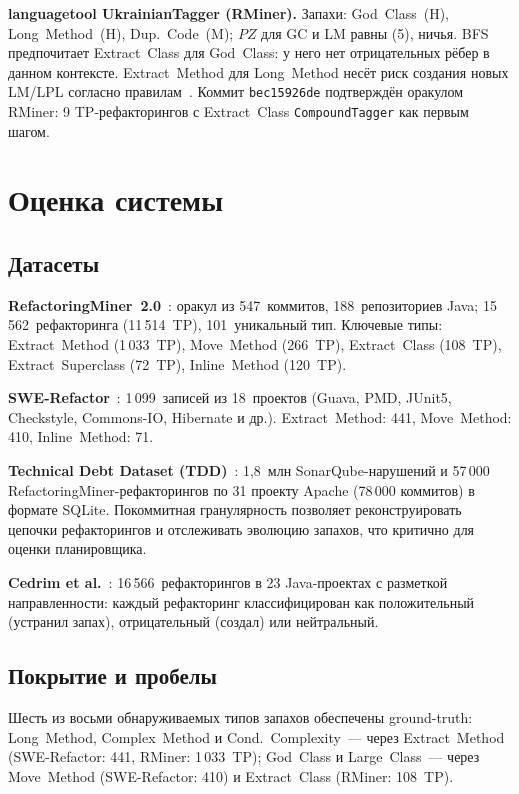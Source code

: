 \documentclass[conference]{IEEEtran}
\begin{document}
\textbf{languagetool UkrainianTagger (RMiner).}
Запахи: God~Class~(H), Long~Method~(H), Dup.~Code~(M); $PZ$ для GC и LM
равны (5), ничья.
BFS предпочитает Extract~Class для God~Class: у него нет
отрицательных рёбер в данном контексте.
Extract~Method для Long~Method несёт риск создания новых LM/LPL
согласно правилам~\cite{markovic2020}.
Коммит \texttt{bec15926de} подтверждён оракулом RMiner:
9 TP-рефакторингов с Extract~Class \texttt{CompoundTagger}
как первым шагом.

\section{Оценка системы}

\subsection{Датасеты}

\textbf{RefactoringMiner~2.0}~\cite{rminer2022}: оракул из 547~коммитов,
188~репозиториев Java; 15\,562~рефакторинга (11\,514~TP),
101~уникальный тип.
Ключевые типы: Extract~Method (1\,033~TP), Move~Method (266~TP),
Extract~Class (108~TP), Extract~Superclass (72~TP),
Inline~Method (120~TP).

\textbf{SWE-Refactor}~\cite{swerefactor2024}: 1\,099~записей из
18~проектов (Guava, PMD, JUnit5, Checkstyle, Commons-IO, Hibernate
и др.).
Extract~Method: 441, Move~Method: 410, Inline~Method: 71.

\textbf{Technical Debt Dataset (TDD)}~\cite{lenarduzzi2019}: 1,8~млн
SonarQube-нарушений и 57\,000 RefactoringMiner-рефакторингов
по 31 проекту Apache (78\,000 коммитов) в формате SQLite.
Покоммитная гранулярность позволяет реконструировать цепочки
рефакторингов и отслеживать эволюцию запахов, что критично
для оценки планировщика.

\textbf{Cedrim et al.}~\cite{cedrim2017}: 16\,566~рефакторингов
в 23 Java-проектах с разметкой направленности: каждый рефакторинг
классифицирован как положительный (устранил запах), отрицательный
(создал) или нейтральный.

\subsection{Покрытие и пробелы}

Шесть из восьми обнаруживаемых типов запахов обеспечены ground-truth:
Long~Method, Complex~Method и Cond.~Complexity~--- через Extract~Method
(SWE-Refactor: 441, RMiner: 1\,033~TP);
God~Class и Large~Class~--- через Move~Method (SWE-Refactor: 410)
и Extract~Class (RMiner: 108~TP).
\end{document}
